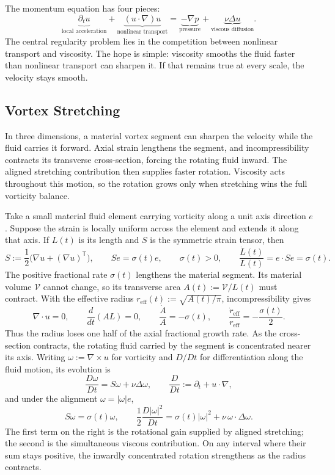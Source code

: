 
The momentum equation has four pieces:
\[
  \underbrace{\partial_t u}_{\text{local acceleration}}
  +
  \underbrace{(u\cdot\nabla)u}_{\text{nonlinear transport}}
  =
  \underbrace{-\nabla p}_{\text{pressure}}
  +
  \underbrace{\nu\Delta u}_{\text{viscous diffusion}}.
\]
The central regularity problem lies in the competition between nonlinear transport and viscosity.
The hope is simple: viscosity smooths the fluid faster than nonlinear transport can sharpen it.
If that remains true at every scale, the velocity stays smooth.

\subsection{Vortex Stretching}\label{sub:ThePerfectlyStretchingVortex}

In three dimensions, a material vortex segment can sharpen the velocity while the fluid carries it forward. Axial strain lengthens the segment, and incompressibility contracts its transverse cross-section, forcing the rotating fluid inward. The aligned stretching contribution then supplies faster rotation. Viscosity acts throughout this motion, so the rotation grows only when stretching wins the full vorticity balance.

Take a small material fluid element carrying vorticity along a unit axis direction \(e\). Suppose the strain is locally uniform across the element and extends it along that axis. If \(L(t)\) is its length and \(S\) is the symmetric strain tensor, then
\[
  S:=\frac12\bigl(\nabla u+(\nabla u)^{\mathsf T}\bigr),
  \qquad
  Se=\sigma(t)e,
  \qquad
  \sigma(t)>0,
  \qquad
  \frac{\dot L(t)}{L(t)}
  =
  e\cdot Se
  =
  \sigma(t).
\]
The positive fractional rate \(\sigma(t)\) lengthens the material segment. Its material volume \(\mathcal V\) cannot change, so its transverse area \(A(t):=\mathcal V/L(t)\) must contract. With the effective radius \(r_{\mathrm{eff}}(t):=\sqrt{A(t)/\pi}\), incompressibility gives
\[
  \nabla\cdot u=0,
  \qquad
  \frac{d}{dt}(A L)=0,
  \qquad
  \frac{\dot A}{A}=-\sigma(t),
  \qquad
  \frac{\dot r_{\mathrm{eff}}}{r_{\mathrm{eff}}}
  =
  -\frac{\sigma(t)}{2}.
\]
Thus the radius loses one half of the axial fractional growth rate. As the cross-section contracts, the rotating fluid carried by the segment is concentrated nearer its axis. Writing \(\omega:=\nabla\times u\) for vorticity and \(D/Dt\) for differentiation along the fluid motion, its evolution is
\[
  \frac{D\omega}{Dt}
  =
  S\omega+\nu\Delta\omega,
  \qquad
  \frac{D}{Dt}
  :=
  \partial_t+u\cdot\nabla,
\]
and under the alignment \(\omega=|\omega|e\),
\[
  S\omega
  =
  \sigma(t)\omega,
  \qquad
  \frac12\frac{D|\omega|^2}{Dt}
  =
  \sigma(t)|\omega|^2
  +
  \nu\,\omega\cdot\Delta\omega.
\]
The first term on the right is the rotational gain supplied by aligned stretching; the second is the simultaneous viscous contribution. On any interval where their sum stays positive, the inwardly concentrated rotation strengthens as the radius contracts.

